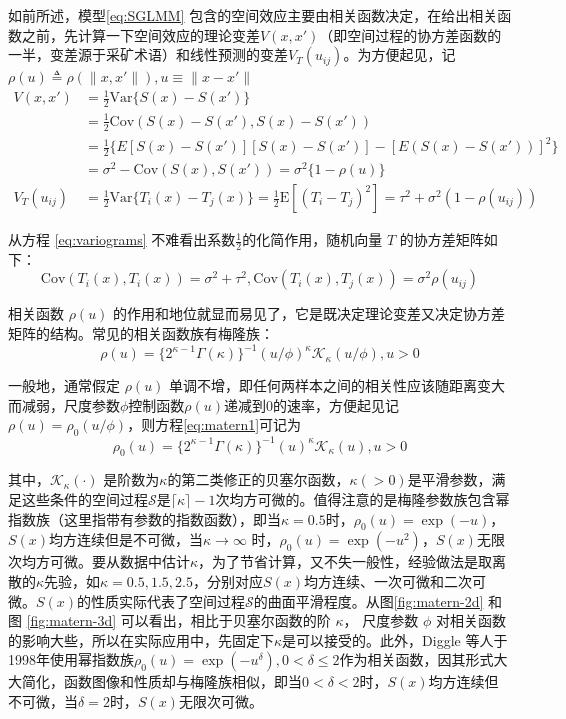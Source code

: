 \documentclass[hyperref, a4paper, UTF8, zihao = -4, linespread = 1.25, scheme = chinese]{ctexbook}
\begin{document}
如前所述，模型\eqref{eq:SGLMM}
包含的空间效应主要由相关函数决定，在给出相关函数之前，先计算一下空间效应的理论变差\(V(x,x')\)（即空间过程的协方差函数的一半，变差源于采矿术语）和线性预测的变差\(V_{T}(u_{ij})\)。为方便起见，记\(\rho(u) \triangleq \rho(\|x,x'\|),u \equiv \|x-x'\|\)
\begin{equation}
\begin{aligned}
V(x,x')&=\frac{1}{2}\mathrm{Var}\{S(x)-S(x')\}\\
&=\frac{1}{2}\mathrm{Cov}(S(x)-S(x'),S(x)-S(x'))\\
&=\frac{1}{2}\{E[S(x)-S(x')][S(x)-S(x')]-[E(S(x)-S(x'))]^2\}\\
&=\sigma^2-\mathrm{Cov}(S(x),S(x'))=\sigma^2\{1-\rho(u)\}\\
V_{T}(u_{ij})&=\frac{1}{2}\mathrm{Var}\{T_{i}(x)-T_{j}(x)\}
=\frac{1}{2}\mathrm{E}[(T_{i}-T_{j})^2]=\tau^2+\sigma^2(1-\rho(u_{ij})) \label{eq:variograms}
\end{aligned}
\end{equation}

从方程 \eqref{eq:variograms}
不难看出系数\(\frac{1}{2}\)的化简作用，随机向量 \(T\)
的协方差矩阵如下：\[\mathrm{Cov}(T_{i}(x),T_{i}(x)) = \sigma^2+\tau^2, \mathrm{Cov}(T_{i}(x),T_{j}(x))=\sigma^2\rho(u_{ij})\]

相关函数 \(\rho(u)\)
的作用和地位就显而易见了，它是既决定理论变差又决定协方差矩阵的结构。常见的相关函数族有梅隆族：\begin{equation}
\rho(u)=\{2^{\kappa -1}\Gamma(\kappa)\}^{-1}(u/\phi)^{\kappa}\mathcal{K}_{\kappa}(u/\phi),u > 0 \label{eq:matern1}
\end{equation}

一般地，通常假定 \(\rho(u)\)
单调不增，即任何两样本之间的相关性应该随距离变大而减弱，尺度参数\(\phi\)控制函数\(\rho(u)\)递减到0的速率，方便起见记
\(\rho(u) = \rho_{0}(u/\phi)\)，则方程\eqref{eq:matern1}可记为\begin{equation}
\rho_{0}(u)=\{2^{\kappa -1}\Gamma(\kappa)\}^{-1}(u)^{\kappa}\mathcal{K}_{\kappa}(u),u > 0 \label{eq:matern2}
\end{equation}

其中，\(\mathcal{K}_{\kappa}(\cdot)\)
是阶数为\(\kappa\)的第二类修正的贝塞尔函数，\(\kappa(>0)\)是平滑参数，满足这些条件的空间过程\(\mathcal{S}\)是\(\lceil\kappa\rceil-1\)次均方可微的。值得注意的是梅隆参数族包含幂指数族（这里指带有参数的指数函数），即当\(\kappa=0.5\)时，\(\rho_{0}(u)=\exp(-u)\)，\(S(x)\)均方连续但是不可微，当\(\kappa \to \infty\)
时，\(\rho_{0}(u)=\exp(-u^2)\)，\(S(x)\)无限次均方可微。要从数据中估计\(\kappa\)，为了节省计算，又不失一般性，经验做法是取离散的\(\kappa\)先验，如\(\kappa=0.5,1.5,2.5\)，分别对应\(S(x)\)均方连续、一次可微和二次可微。\(S(x)\)的性质实际代表了空间过程\(\mathcal{S}\)的曲面平滑程度。从图\ref{fig:matern-2d}
和图 \ref{fig:matern-3d} 可以看出，相比于贝塞尔函数的阶 \(\kappa\)，
尺度参数 \(\phi\)
对相关函数的影响大些，所以在实际应用中，先固定下\(\kappa\)是可以接受的。此外，Diggle
等人于1998年使用幂指数族\(\rho_{0}(u)=\exp(-u^{\delta}), 0 < \delta \leq 2\)作为相关函数\citep{Diggle1998}，因其形式大大简化，函数图像和性质却与梅隆族相似，即当\(0<\delta<2\)时，\(S(x)\)均方连续但不可微，当\(\delta=2\)时，\(S(x)\)无限次可微。
\end{document}
